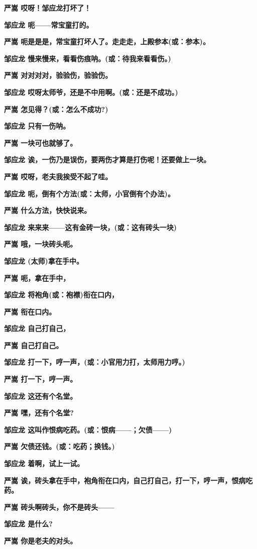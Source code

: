 \textbf{严嵩 哎呀！邹应龙打坏了！}

\textbf{邹应龙 呃------常宝童打的。}

\textbf{严嵩 呃是是是，常宝童打坏人了。走走走，上殿参本(或：参本)。}

\textbf{邹应龙 慢来慢来，看看伤痕呐。(或：待我来看看伤。)}

\textbf{严嵩 对对对对，验验伤，验验伤。}

\textbf{邹应龙 哎呀太师爷，还是不中用啊。(或：还是不成功。)}

\textbf{严嵩 怎见得？(或：怎么不成功?)}

\textbf{邹应龙 只有一伤呐。}

\textbf{严嵩 一块可也就够了。}

\textbf{邹应龙 诶，一伤乃是误伤，要两伤才算是打伤呢！还要做上一块。}

\textbf{严嵩 哎呀，老夫我挨受不起了哇。}

\textbf{邹应龙 呃，倒有个方法(或：太师，小官倒有个办法)。}

\textbf{严嵩 什么方法，快快说来。}

\textbf{邹应龙 来来来------这有金砖一块，(或：这有砖头一块)}

\textbf{严嵩 哦，一块砖头呃。}

\textbf{邹应龙 (太师)拿在手中。}

\textbf{严嵩 呃，拿在手中，}

\textbf{邹应龙 将袍角(或：袍襟)衔在口内，}

\textbf{严嵩 衔在口内。}

\textbf{邹应龙 自己打自己，}

\textbf{严嵩 自己打自己。}

\textbf{邹应龙 打一下，哼一声，(或：小官用力打，太师用力哼。)}

\textbf{严嵩 打一下，哼一声。}

\textbf{邹应龙 这还有个名堂。}

\textbf{严嵩 嘿，还有个名堂?}

\textbf{邹应龙 这叫作恨病吃药。(或：恨病------；欠债------)}

\textbf{严嵩 欠债还钱。(或：吃药；换钱。)}

\textbf{邹应龙 着啊，试上一试。}

\textbf{严嵩
诶，砖头拿在手中，袍角衔在口内，自己打自己，打一下，哼一声，恨病吃药。}

\textbf{严嵩 砖头啊砖头，你不是砖头------}

\textbf{邹应龙 是什么?}

\textbf{严嵩 你是老夫的对头。}

